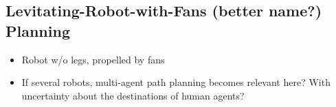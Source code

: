 
\subsection{Levitating-Robot-with-Fans (better name?) Planning}

\begin{itemize}

\item Robot w/o legs, propelled by fans
   
\item If several robots, multi-agent path planning becomes relevant
  here? With uncertainty about the destinations of human agents?
  
\end{itemize}
